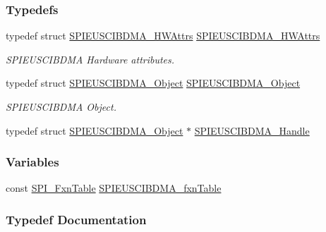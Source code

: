 \subsubsection*{Typedefs}
\begin{DoxyCompactItemize}
\item 
typedef struct \hyperlink{struct_s_p_i_e_u_s_c_i_b_d_m_a___h_w_attrs}{S\+P\+I\+E\+U\+S\+C\+I\+B\+D\+M\+A\+\_\+\+H\+W\+Attrs} \hyperlink{_s_p_i_e_u_s_c_i_b_d_m_a_8h_a749c57472b0dd55a73f1cd1c6ef78927}{S\+P\+I\+E\+U\+S\+C\+I\+B\+D\+M\+A\+\_\+\+H\+W\+Attrs}
\begin{DoxyCompactList}\small\item\em S\+P\+I\+E\+U\+S\+C\+I\+B\+D\+M\+A Hardware attributes. \end{DoxyCompactList}\item 
typedef struct \hyperlink{struct_s_p_i_e_u_s_c_i_b_d_m_a___object}{S\+P\+I\+E\+U\+S\+C\+I\+B\+D\+M\+A\+\_\+\+Object} \hyperlink{_s_p_i_e_u_s_c_i_b_d_m_a_8h_a2ec8ab315cc978ab2308a24ba6b6f82f}{S\+P\+I\+E\+U\+S\+C\+I\+B\+D\+M\+A\+\_\+\+Object}
\begin{DoxyCompactList}\small\item\em S\+P\+I\+E\+U\+S\+C\+I\+B\+D\+M\+A Object. \end{DoxyCompactList}\item 
typedef struct \hyperlink{struct_s_p_i_e_u_s_c_i_b_d_m_a___object}{S\+P\+I\+E\+U\+S\+C\+I\+B\+D\+M\+A\+\_\+\+Object} $\ast$ \hyperlink{_s_p_i_e_u_s_c_i_b_d_m_a_8h_af48075210fdae29550dff1b9074cd29b}{S\+P\+I\+E\+U\+S\+C\+I\+B\+D\+M\+A\+\_\+\+Handle}
\end{DoxyCompactItemize}
\subsubsection*{Variables}
\begin{DoxyCompactItemize}
\item 
const \hyperlink{struct_s_p_i___fxn_table}{S\+P\+I\+\_\+\+Fxn\+Table} \hyperlink{_s_p_i_e_u_s_c_i_b_d_m_a_8h_acd20860a4e9835980bcee70691aa726a}{S\+P\+I\+E\+U\+S\+C\+I\+B\+D\+M\+A\+\_\+fxn\+Table}
\end{DoxyCompactItemize}


\subsubsection{Typedef Documentation}
